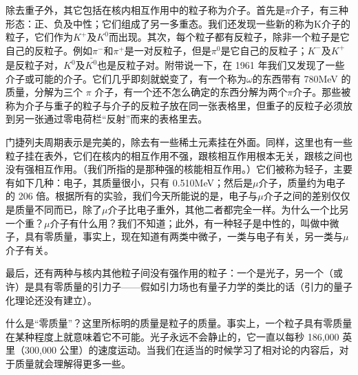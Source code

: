 \documentclass[12pt,oneside]{book}
\begin{document}
除去重子外，其它包括在核内相互作用中的粒子称为介子。首先是$\pi$介子，有三种形态：正、负及中性；它们组成了另一多重态。我们还发现一些新的称为K介子的粒子，它们作为$ K^{+} $及$ { K }^{ 0 } $而出现。其次，每个粒子都有反粒子，除非一个粒子是它自己的反粒子。例如$\pi^{-} $和$\pi^{+} $是一对反粒子，但是$\pi^0 $是它自己的反粒子；$K^- $及$ K^+ $是反粒子对，$ { K }^{ 0 } $及$ \bar {{ K }^{ 0 } }  $也是反粒子对。附带说一下，在 1961 年我们又发现了一些介子或可能的介子。它们几乎即刻就蜕变了，有一个称为$\omega$的东西带有 780MeV 的质量，分解为三个 $\pi$ 介子，有一个还不怎么确定的东西分解为两个$\pi$介子。那些被称为介子与重子的粒子与介子的反粒子放在同一张表格里，但重子的反粒子必须放到另一张通过零电荷栏“反射”而来的表格里去。

门捷列夫周期表示是完美的，除去有一些稀土元素挂在外面。同样，这里也有一些粒子挂在表外，它们在核内的相互作用不强，跟核相互作用根本无关，跟核之间也没有强相互作用。（我们所指的是那种强的核能相互作用。）它们被称为轻子，主要有如下几种：电子，其质量很小，只有 0.510MeV；然后是$\mu$介子，质量约为电子的 206 倍。根据所有的实验，我们今天所能说的是，电子与$\mu$介子之间的差别仅仅是质量不同而已，除了$\mu$介子比电子重外，其他二者都完全一样。为什么一个比另一个重？$\mu$介子有什么用？我们不知道；此外，有一种轻子是中性的，叫做中微子，具有零质量，事实上，现在知道有两类中微子，一类与电子有关，另一类与$\mu$介子有关。

最后，还有两种与核内其他粒子间没有强作用的粒子：一个是光子，另一个（或许）是具有零质量的引力子——假如引力场也有量子力学的类比的话（引力的量子化理论还没有建立）。

什么是“零质量”？这里所标明的质量是粒子的质量。事实上，一个粒子具有零质量在某种程度上就意味着它不可能。光子永远不会静止的，它一直以每秒 186,000 英里（300,000 公里）的速度运动。当我们在适当的时候学习了相对论的内容后，对于质量就会理解得更多一些。
\end{document}
